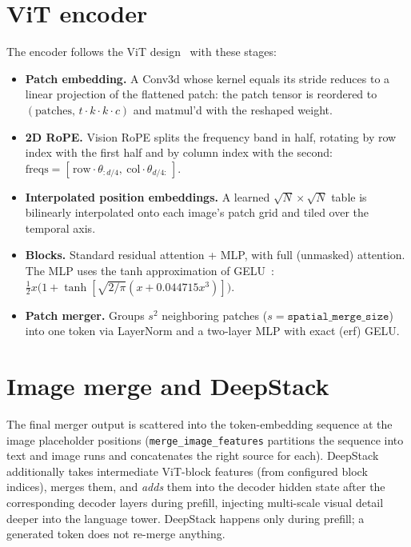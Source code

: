 \documentclass[11pt,a4paper]{report}
\newcommand{\code}[1]{\texttt{#1}}
\begin{document}
\section{ViT encoder}
The encoder follows the ViT design~\citep{dosovitskiy2021vit} with these stages:
\begin{itemize}[nosep]
  \item \textbf{Patch embedding.} A Conv3d whose kernel equals its stride reduces to
        a linear projection of the flattened patch: the patch tensor is reordered to
        $(\text{patches},\, t\cdot k\cdot k\cdot c)$ and matmul'd with the reshaped
        weight.
  \item \textbf{2D RoPE.} Vision RoPE splits the frequency band in half, rotating by
        row index with the first half and by column index with the second:
        $\text{freqs} = [\,\text{row}\cdot\theta_{:d/4},\ \text{col}\cdot\theta_{d/4:}\,]$.
  \item \textbf{Interpolated position embeddings.} A learned
        $\sqrt{N}\times\sqrt{N}$ table is bilinearly interpolated onto each image's
        patch grid and tiled over the temporal axis.
  \item \textbf{Blocks.} Standard residual attention + MLP, with full (unmasked)
        attention. The MLP uses the tanh approximation of GELU~\citep{hendrycks2016gelu}:
        $\tfrac12 x\big(1+\tanh[\sqrt{2/\pi}(x+0.044715x^3)]\big)$.
  \item \textbf{Patch merger.} Groups $s^2$ neighboring patches
        ($s=\texttt{spatial\_merge\_size}$) into one token via LayerNorm and a
        two-layer MLP with exact (erf) GELU.
\end{itemize}

\section{Image merge and DeepStack}
The final merger output is scattered into the token-embedding sequence at the image
placeholder positions (\code{merge\_image\_features} partitions the sequence into
text and image runs and concatenates the right source for each). DeepStack
additionally takes intermediate ViT-block features (from configured block indices),
merges them, and \emph{adds} them into the decoder hidden state after the
corresponding decoder layers during prefill, injecting multi-scale visual detail
deeper into the language tower. DeepStack happens only during prefill; a generated
token does not re-merge anything.
\end{document}
